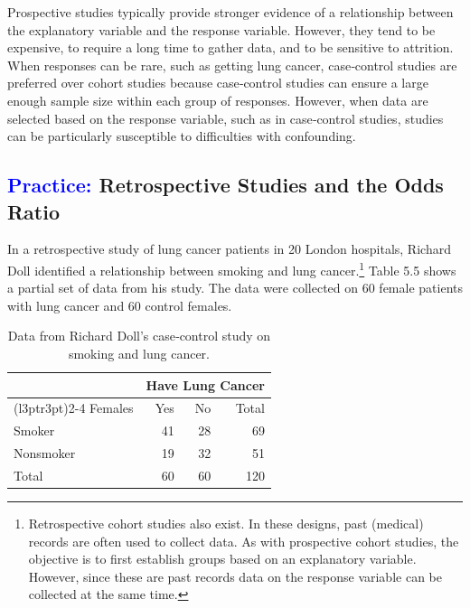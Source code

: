 \documentclass[
]{report}
\begin{document}
Prospective studies typically provide stronger evidence of a relationship between the explanatory variable and the response variable. However, they tend to be expensive, to require a long time to gather data, and to be sensitive to attrition. When responses can be rare, such as getting lung cancer, case‑control studies are preferred over cohort studies because case‑control studies can ensure a large enough sample size within each group of responses. However, when data are selected based on the response variable, such as in case‑control studies, studies can be particularly susceptible to difficulties with confounding.

\hypertarget{retrospective-studies-and-the-odds-ratio}{%
\subsection*{\texorpdfstring{\textcolor{blue}{Practice:} Retrospective Studies and the Odds Ratio}{ Retrospective Studies and the Odds Ratio}}\label{retrospective-studies-and-the-odds-ratio}}

In a retrospective study of lung cancer patients in 20 London hospitals, Richard Doll identified a relationship between smoking and lung cancer.\footnote{Retrospective cohort studies also exist. In these designs, past (medical) records are often used to collect data. As with prospective cohort studies, the objective is to first establish groups based on an explanatory variable. However, since these are past records data on the response variable can be collected at the same time.} Table 5.5 shows a partial set of data from his study. The data were collected on 60 female patients with lung cancer and 60 control females.

\begin{table}[!h]
\centering
\caption{\label{tab:tab55} Data from Richard Doll’s case‐control study on smoking and lung cancer.}
\centering
\begin{tabular}[t]{lrrr}
\toprule
\multicolumn{1}{c}{ } & \multicolumn{3}{c}{Have Lung Cancer} \\
\cmidrule(l{3pt}r{3pt}){2-4}
Females & Yes & No & Total\\
\midrule
Smoker & 41 & 28 & 69\\
Nonsmoker & 19 & 32 & 51\\
Total & 60 & 60 & 120\\
\bottomrule
\end{tabular}
\end{table}
\end{document}
